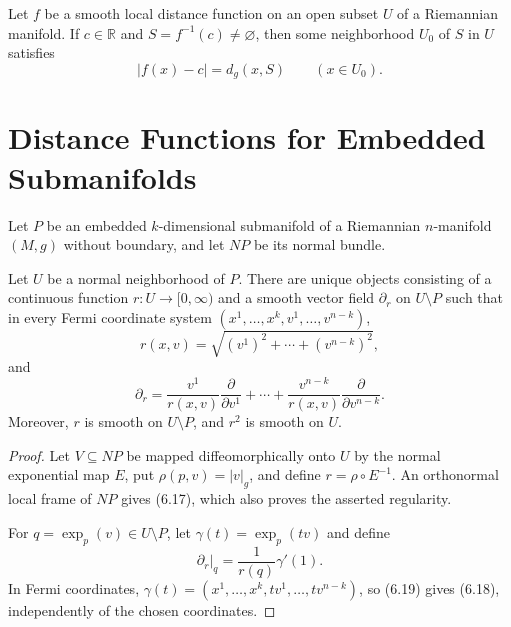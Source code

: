 \begin{corollary}
\label{cor:local-distance-smooth-level-sets}

Let $f$ be a smooth local distance function on an open subset $U$ of a
Riemannian manifold. If $c\in\mathbb R$ and
$S=f^{-1}(c)\neq\varnothing$, then some neighborhood $U_0$ of $S$ in $U$
satisfies
\[
|f(x)-c|=d_g(x,S)
\qquad(x\in U_0).
\]
\end{corollary}

\section{Distance Functions for Embedded Submanifolds}

Let $P$ be an embedded $k$-dimensional submanifold of a Riemannian
$n$-manifold $(M,g)$ without boundary, and let $NP$ be its normal bundle.

\begin{proposition}
\label{prop:fermi-coordinates-radial-function}

Let $U$ be a normal neighborhood of $P$. There are unique objects consisting
of a continuous function $r:U\to[0,\infty)$ and a smooth vector field
$\partial_r$ on $U\setminus P$ such that in every Fermi coordinate system
$(x^1,\ldots,x^k,v^1,\ldots,v^{n-k})$,
\begin{equation}
r(x,v)=\sqrt{(v^1)^2+\cdots+(v^{n-k})^2},
\tag{6.17}
\end{equation}
and
\begin{equation}
\partial_r
=\frac{v^1}{r(x,v)}\frac{\partial}{\partial v^1}
+\cdots+
\frac{v^{n-k}}{r(x,v)}\frac{\partial}{\partial v^{n-k}}.
\tag{6.18}
\end{equation}
Moreover, $r$ is smooth on $U\setminus P$, and $r^2$ is smooth on $U$.
\end{proposition}

\begin{proof}
\sketch Let $V\subseteq NP$ be mapped diffeomorphically onto $U$ by the
normal exponential map $E$, put $\rho(p,v)=|v|_g$, and define
$r=\rho\circ E^{-1}$. An orthonormal local frame of $NP$ gives (6.17), which
also proves the asserted regularity.

For $q=\exp_p(v)\in U\setminus P$, let $\gamma(t)=\exp_p(tv)$ and define
\begin{equation}
\partial_r|_q=\frac1{r(q)}\gamma'(1).
\tag{6.19}
\end{equation}
In Fermi coordinates, $\gamma(t)=(x^1,\ldots,x^k,tv^1,\ldots,tv^{n-k})$,
so (6.19) gives (6.18), independently of the chosen coordinates.
\end{proof}

